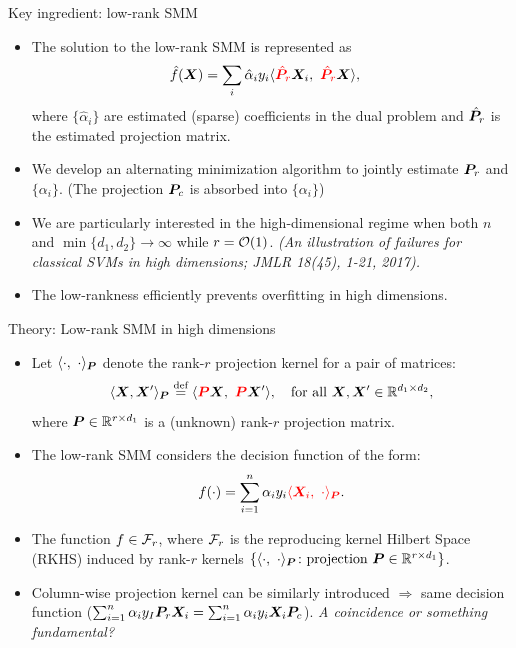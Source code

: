 \documentclass[compress,dvipsnames]{beamer}
\let\olditem\item
\renewcommand\item{\olditem\justifying}
\begin{document}
\begin{frame}{Key ingredient: low-rank SMM}
\begin{itemize}
\item The solution to the low-rank SMM is represented as
\begin{align}
\hat f(\bm{X})&=\sum_{i}\hat \alpha_i y_i\langle {\color{red}\hat {\bm{P}}_r}\bm{X}_i,\ {\color{red}\hat {\bm{P}}_r }\bm{X} \rangle,
\end{align}
where $\{\hat \alpha_i\}$ are estimated (sparse) coefficients in the dual problem and $\hat {\bm{P}}_r$ is the estimated projection matrix. 
\item We develop an alternating minimization algorithm to jointly estimate $\bm{P}_r$ and $\{\alpha_i\}$. (The projection $\bm{P}_c$ is absorbed into $\{\alpha_i\}$)
\item We are particularly interested in the high-dimensional regime when both $n$ and $\min\{d_1,d_2\}\to \infty$ while $r={\mathcal O}(1)$. {\it \scriptsize(An illustration of failures for classical SVMs in high dimensions; JMLR 18(45), 1-21, 2017).} 
\item The {\color{red}low-rankness} efficiently prevents overfitting in high dimensions.
 \end{itemize}
\end{frame}

\begin{frame}{Theory: Low-rank SMM in high dimensions}

\begin{itemize}
\item Let $\langle \cdot,\ \cdot \rangle_{\bm{P}}$ denote the rank-$r$ projection kernel for a pair of matrices:
\[
\langle \bm{X}, \bm{X}' \rangle_{\bm{P}}\stackrel{\text{def}}{=} \langle {\color{red}\bm{P}} \bm{X},\ {\color{red}\bm{P}} \bm{X}'\rangle, \quad \text{for all }\bm{X}, \bm{X}'\in\mathbb{R}^{d_1\times d_2},
\]
where $\bm{P}\in \mathbb{R}^{r\times d_1}$ is a (unknown) rank-$r$ projection matrix.
\item The low-rank SMM considers the decision function of the form:
\begin{align}\label{eq:f}
f(\cdot)=\sum_{i=1}^n \alpha_i y_i {\color{red}\langle \bm{X}_i,\ \cdot \rangle_{\bm{P}}}.
\end{align}
\item The function $f\in {\mathcal F}_r$, where ${\mathcal F}_r$ is the reproducing kernel Hilbert Space (RKHS) induced by rank-$r$ kernels $\{\langle \cdot,\ \cdot\rangle_{\bm{P}}\colon {\text{projection }} \bm{P}\in\mathbb{R}^{r\times d_1}\}$. 
\item Column-wise projection kernel can be similarly introduced $\Rightarrow$ same decision function ($\sum_{i=1}^n\alpha_iy_I\bm{P}_r\bm{X}_i = \sum_{i=1}^n\alpha_iy_i\bm{X}_i\bm{P}_c$). {\it A coincidence or something fundamental?} 
\end{itemize}
\end{frame}
\end{document}
